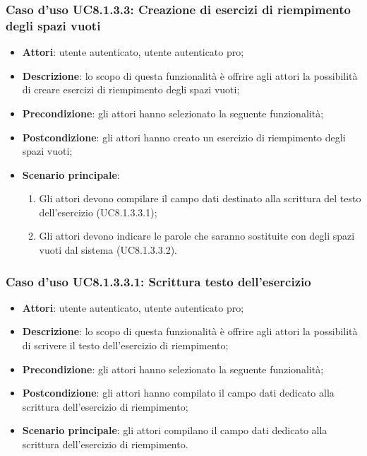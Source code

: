 \subsubsection{Caso d'uso UC8.1.3.3: Creazione di esercizi di riempimento degli spazi vuoti}
	\begin{itemize}
		\item
			\textbf{Attori}: utente autenticato, utente autenticato pro;
		\item		
			\textbf{Descrizione}: lo scopo di questa funzionalità è offrire agli attori la possibilità di creare esercizi di riempimento degli spazi vuoti;
		\item
			\textbf{Precondizione}: gli attori hanno selezionato la seguente funzionalità; 
		\item
			\textbf{Postcondizione}: gli attori hanno creato un esercizio di riempimento degli spazi vuoti;
		\item
			\textbf{Scenario principale}:
	       		\begin{enumerate}
	       			\item
	       			Gli attori devono compilare il campo dati destinato alla scrittura del testo dell'esercizio (UC8.1.3.3.1);
	       			\item
	       			Gli attori devono indicare le parole che saranno sostituite con degli spazi vuoti dal sistema (UC8.1.3.3.2).
	 			\end{enumerate}
	\end{itemize}
	
\subsubsection{Caso d'uso UC8.1.3.3.1: Scrittura testo dell'esercizio}
	\begin{itemize}
		\item
			\textbf{Attori}: utente autenticato, utente autenticato pro;
		\item		
			\textbf{Descrizione}: lo scopo di questa funzionalità è offrire agli attori la possibilità di scrivere il testo dell'esercizio di riempimento;
		\item
			\textbf{Precondizione}: gli attori hanno selezionato la seguente funzionalità; 
		\item
			\textbf{Postcondizione}: gli attori hanno compilato il campo dati dedicato alla scrittura dell'esercizio di riempimento;
		\item
			\textbf{Scenario principale}: gli attori compilano il campo dati dedicato alla scrittura dell'esercizio di riempimento.
	\end{itemize}


